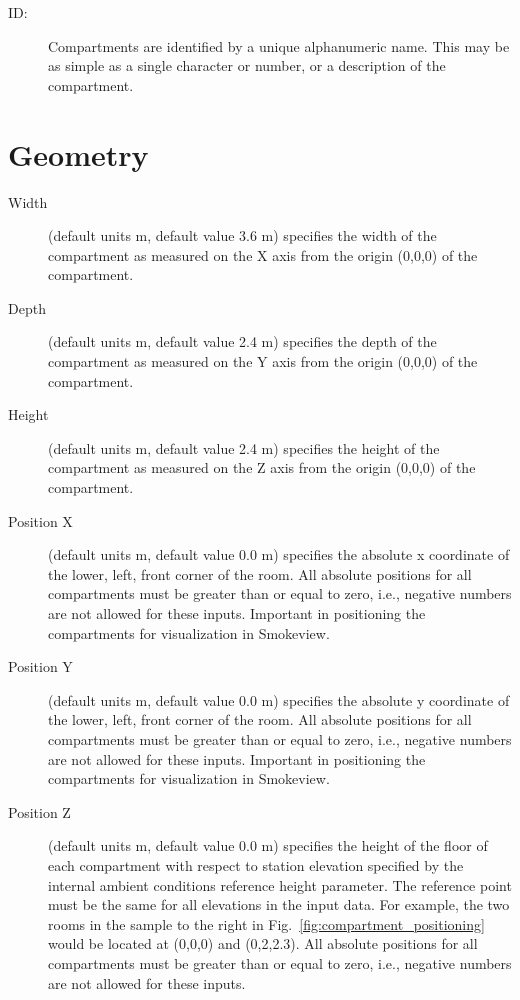 \begin{description}
\item[ ID:] Compartments are identified by a unique alphanumeric name.  This may be as simple as a single character or number, or a description of the compartment.
\end{description}




\section{Geometry}
\label{info:COMP}
\begin{description}
\item[Width] (default units m, default value 3.6 m) specifies the width of the compartment as measured on the X axis from the origin (0,0,0) of the compartment.

\item[Depth]  (default units m, default value 2.4 m) specifies the depth of the compartment as measured on the Y axis from the origin (0,0,0) of the compartment.

\item[Height] (default units m, default value 2.4 m)  specifies the height of the compartment as measured on the Z axis from the origin (0,0,0) of the compartment.

\item[Position X] (default units m, default value 0.0 m)  specifies the absolute x coordinate of the lower, left, front corner of the room. All absolute positions for all compartments must be greater than or equal to zero, i.e., negative numbers are not allowed for these inputs. Important in positioning the compartments for visualization in Smokeview.

\item[Position Y] (default units m, default value 0.0 m)  specifies the absolute y coordinate of the lower, left, front corner of the room. All absolute positions for all compartments must be greater than or equal to zero, i.e., negative numbers are not allowed for these inputs. Important in positioning the compartments for visualization in Smokeview.

\item[Position Z] (default units m, default value 0.0 m)  specifies the height of the floor of each compartment with respect to station elevation specified by the internal ambient conditions reference height parameter.  The reference point must be the same for all elevations in the input data.  For example, the two rooms in the sample to the right in Fig.~\ref{fig:compartment_positioning} would be located at (0,0,0) and (0,2,2.3). All absolute positions for all compartments must be greater than or equal to zero, i.e., negative numbers are not allowed for these inputs.
\end{description}




